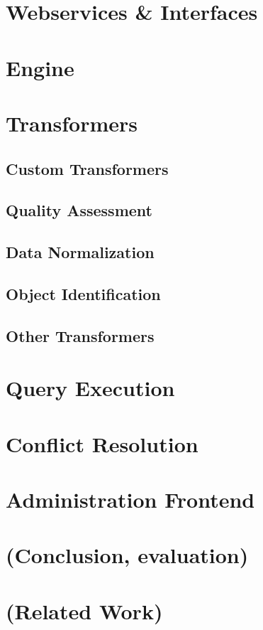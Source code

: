 \chapter{Webservices \& Interfaces}

\chapter{Engine}

\chapter{Transformers}

\section{Custom Transformers}
\section{Quality Assessment}
\section{Data Normalization}
\section{Object Identification}
\section{Other Transformers}

\chapter{Query Execution}

\chapter{Conflict Resolution}

\chapter{Administration Frontend}

\chapter{(Conclusion, evaluation)}

\chapter{(Related Work)}


